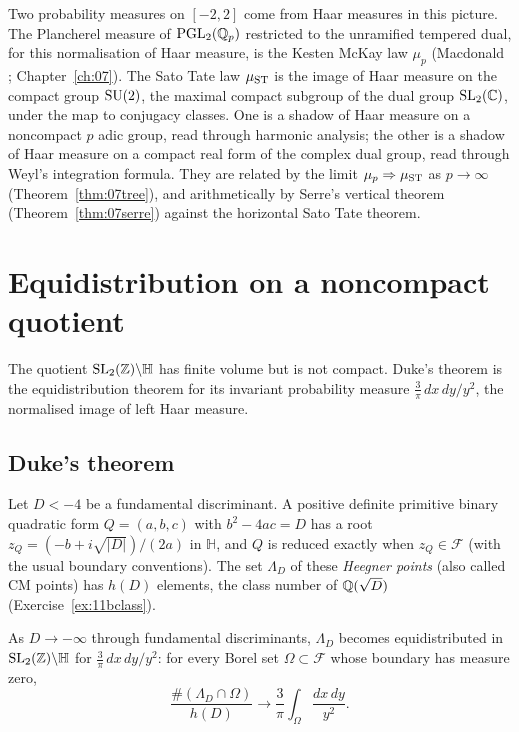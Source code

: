 Two probability measures on $[-2,2]$ come from Haar measures in this picture. The Plancherel measure of $\mathrm{PGL}_2(\mathbb{Q}_p)$ restricted to the unramified tempered dual, for this normalisation of Haar measure, is the Kesten McKay law $\mu_p$ (Macdonald \cite{macdonald1971}; Chapter~\ref{ch:07}). The Sato Tate law $\mu_{\mathrm{ST}}$ is the image of Haar measure on the compact group $\mathrm{SU}(2)$, the maximal compact subgroup of the dual group $\mathrm{SL}_2(\mathbb{C})$, under the map to conjugacy classes. One is a shadow of Haar measure on a noncompact $p$ adic group, read through harmonic analysis; the other is a shadow of Haar measure on a compact real form of the complex dual group, read through Weyl's integration formula. They are related by the limit $\mu_p\Rightarrow\mu_{\mathrm{ST}}$ as $p\to\infty$ (Theorem~\ref{thm:07tree}), and arithmetically by Serre's vertical theorem (Theorem~\ref{thm:07serre}) against the horizontal Sato Tate theorem.

\section{Equidistribution on a noncompact quotient}\label{sec:11bduke}

The quotient $\mathrm{SL}_2(\mathbb{Z})\backslash\mathbb H$ has finite volume but is not compact. Duke's theorem is the equidistribution theorem for its invariant probability measure $\frac3\pi\,dx\,dy/y^2$, the normalised image of left Haar measure.

\subsection{Duke's theorem}

Let $D<-4$ be a fundamental discriminant. A positive definite primitive binary quadratic form $Q=(a,b,c)$ with $b^2-4ac=D$ has a root $z_Q=(-b+i\sqrt{|D|})/(2a)$ in $\mathbb H$, and $Q$ is reduced exactly when $z_Q\in\mathcal F$ (with the usual boundary conventions). The set $\Lambda_D$ of these \emph{Heegner points} (also called CM points) has $h(D)$ elements, the class number of $\mathbb{Q}(\sqrt D)$ (Exercise~\ref{ex:11bclass}).

\begin{theorem}\label{thm:11bduke}
As $D\to-\infty$ through fundamental discriminants, $\Lambda_D$ becomes equidistributed in $\mathrm{SL}_2(\mathbb{Z})\backslash\mathbb H$ for $\frac3\pi\,dx\,dy/y^2$: for every Borel set $\Omega\subset\mathcal F$ whose boundary has measure zero,
\[
\frac{\#(\Lambda_D\cap\Omega)}{h(D)}\longrightarrow\frac3\pi\int_\Omega\frac{dx\,dy}{y^2}.
\]
\end{theorem}

